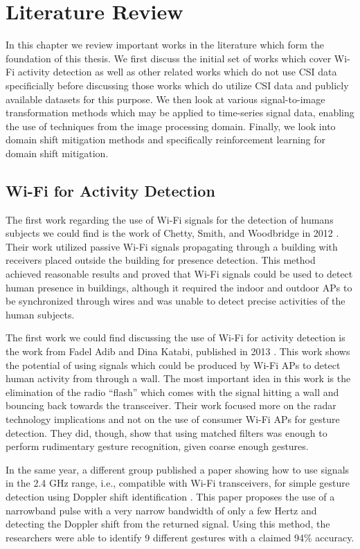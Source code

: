 \chapter{Literature Review}\label{chapter:literature-review}

In this chapter we review important works in the literature which form the foundation of this thesis.
We first discuss the initial set of works which cover Wi-Fi activity detection as well as other related works which do not use CSI data specificially before discussing those works which do utilize CSI data and publicly available datasets for this purpose.
We then look at various signal-to-image transformation methods which may be applied to time-series signal data, enabling the use of techniques from the image processing domain.
Finally, we look into domain shift mitigation methods and specifically reinforcement learning for domain shift mitigation.

\section{Wi-Fi for Activity Detection}

The first work regarding the use of Wi-Fi signals for the detection of humans subjects we could find is the work of Chetty, Smith, and Woodbridge in 2012 \cite{chetty2011through}.
Their work utilized passive Wi-Fi signals propagating through a building with receivers placed outside the building for presence detection.
This method achieved reasonable results and proved that Wi-Fi signals could be used to detect human presence in buildings, although it required the indoor and outdoor APs to be synchronized through wires and was unable to detect precise activities of the human subjects.

The first work we could find discussing the use of Wi-Fi for activity detection is the work from Fadel Adib and Dina Katabi, published in 2013 \cite{adib2013see}.
This work shows the potential of using signals which could be produced by Wi-Fi APs to detect human activity from through a wall.
The most important idea in this work is the elimination of the radio ``flash'' which comes with the signal hitting a wall and bouncing back towards the transceiver.
Their work focused more on the radar technology implications and not on the use of consumer Wi-Fi APs for gesture detection.
They did, though, show that using matched filters was enough to perform rudimentary gesture recognition, given coarse enough gestures.

In the same year, a different group published a paper showing how to use signals in the 2.4 GHz range, i.e., compatible with Wi-Fi transceivers, for simple gesture detection using Doppler shift identification \cite{pu2013whole}.
This paper proposes the use of a narrowband pulse with a very narrow bandwidth of only a few Hertz and detecting the Doppler shift from the returned signal.
Using this method, the researchers were able to identify 9 different gestures with a claimed 94\% accuracy.

